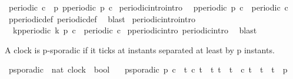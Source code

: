 \begin{isabellebody}
\begin{isamarkuptext}
\end{isamarkuptext}\isamarkuptrue%
\isamarkupfalse%
\ {\isacartoucheopen}periodic\ c\ {\isasymequiv}\ {\isacharparenleft}{\isasymexists}p{\isachardot}\ p{\isacharunderscore}periodic\ p\ c{\isacharparenright}{\isacartoucheclose}\isanewline
\isanewline
{}\isamarkupfalse%
\ periodic{\isacharunderscore}intro{}{\isacharbrackleft}intro{\isacharbrackright}{\isacharcolon}\isanewline
\ \ {\isacartoucheopen}p{\isacharunderscore}periodic\ p\ c\ {\isasymLongrightarrow}\ periodic\ c{\isacartoucheclose}\isanewline
%
\isadelimproof
%
\endisadelimproof
%
\isatagproof
{}\isamarkupfalse%
\ p{\isacharunderscore}periodic{\isacharunderscore}def\ periodic{\isacharunderscore}def\ \isamarkupfalse%
\ blast%
\endisatagproof
{\isafoldproof}%
%
\isadelimproof
\isanewline
%
\endisadelimproof
\isanewline
{}\isamarkupfalse%
\ periodic{\isacharunderscore}intro{}{\isacharbrackleft}intro{\isacharbrackright}{\isacharcolon}\isanewline
\ \ {\isacartoucheopen}kp{\isacharunderscore}periodic\ k\ p\ c\ {\isasymLongrightarrow}\ periodic\ c{\isacartoucheclose}\isanewline
%
\isadelimproof
%
\endisadelimproof
%
\isatagproof
{}\isamarkupfalse%
\ p{\isacharunderscore}periodic{\isacharunderscore}intro\ periodic{\isacharunderscore}intro{}\ \isamarkupfalse%
\ blast%
\endisatagproof
{\isafoldproof}%
%
\isadelimproof
%
\endisadelimproof
%
\isadelimdocument
%
\endisadelimdocument
%
\isatagdocument
%
\isamarkuptrue%
%
\endisatagdocument
{\isafolddocument}%
%
\isadelimdocument
%
\endisadelimdocument
%
\begin{isamarkuptext}%
A clock is p-sporadic if it ticks at instants separated at least by p instants.%
\end{isamarkuptext}\isamarkuptrue%
\isamarkupfalse%
\ p{\isacharunderscore}sporadic\ {\isacharcolon}{\isacharcolon}\ {\isacartoucheopen}{\isacharbrackleft}nat{\isacharcomma}\ clock{\isacharbrackright}\ {\isasymRightarrow}\ bool{\isacartoucheclose}\isanewline
\ \ \ {\isacartoucheopen}p{\isacharunderscore}sporadic\ p\ c\ {\isasymequiv}\ {\isasymforall}t{\isachardot}\ c\ t\ {\isasymlongrightarrow}\ {\isacharparenleft}{\isasymforall}t{\isacharprime}{\isachardot}\ {\isacharparenleft}t{\isacharprime}\ {\isachargreater}\ t\ {\isasymand}\ c\ t{\isacharprime}{\isacharparenright}\ {\isasymlongrightarrow}\ t{\isacharprime}\ {\isachargreater}\ t\ {\isacharplus}\ p{\isacharparenright}{\isacartoucheclose}%

\end{isabellebody}
